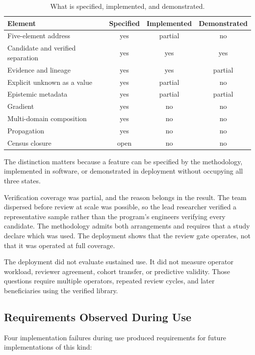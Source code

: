 \documentclass[preprints,article,submit,moreauthors]{Definitions/mdpi}
\begin{document}
\begin{table}[H]
\caption{What is specified, implemented, and demonstrated.}
\label{tab:status}
\centering
\scriptsize
\begin{tabularx}{\columnwidth}{Xccc}
\hline
\textbf{Element} & \textbf{Specified} & \textbf{Implemented} & \textbf{Demonstrated} \\
\hline
Five-element address & yes & partial & no \\
Candidate and verified separation & yes & yes & yes \\
Evidence and lineage & yes & yes & partial \\
Explicit unknown as a value & yes & partial & no \\
Epistemic metadata & yes & partial & partial \\
Gradient & yes & no & no \\
Multi-domain composition & yes & no & no \\
Propagation & yes & no & no \\
Census closure & open & no & no \\
\hline
\end{tabularx}
\end{table}

The distinction matters because a feature can be specified by the methodology, implemented in software, or demonstrated in deployment without occupying all three states.

Verification coverage was partial, and the reason belongs in the result. The team dispersed before review at scale was possible, so the lead researcher verified a representative sample rather than the program's engineers verifying every candidate. The methodology admits both arrangements and requires that a study declare which was used. The deployment shows that the review gate operates, not that it was operated at full coverage.

The deployment did not evaluate sustained use. It did not measure operator workload, reviewer agreement, cohort transfer, or predictive validity. Those questions require multiple operators, repeated review cycles, and later beneficiaries using the verified library.

\subsection{Requirements Observed During Use}\label{sec:7-4}

Four implementation failures during use produced requirements for future implementations of this kind:
\end{document}
